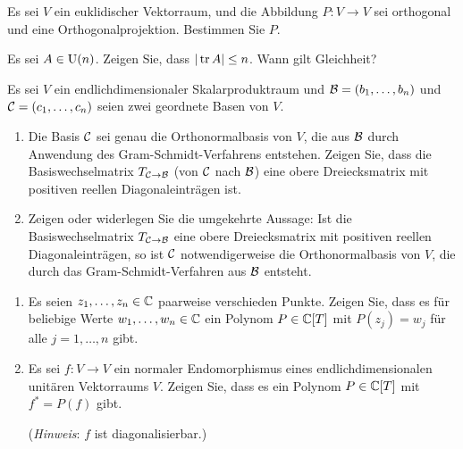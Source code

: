 \documentclass[a4paper,10pt]{scrartcl}
\begin{document}
\begin{question}
  Es sei $V$ ein euklidischer Vektorraum, und die Abbildung $P \colon V \to V$ sei orthogonal und eine Orthogonalprojektion.
  Bestimmen Sie $P$.
\end{question}


\begin{question}
  Es sei $A \in \operatorname{U}(n)$.
  Zeigen Sie, dass $|\operatorname{tr} A| \leq n$.
  Wann gilt Gleichheit?
\end{question}


\begin{question}
  Es sei $V$ ein endlichdimensionaler Skalarproduktraum und $\mathcal{B} = (b_1, \dotsc, b_n)$ und $\mathcal{C} = (c_1, \dotsc, c_n)$ seien zwei geordnete Basen von $V$.
  \begin{enumerate}
    \item
      Die Basis $\mathcal{C}$ sei genau die Orthonormalbasis von $V$, die aus $\mathcal{B}$ durch Anwendung des Gram-Schmidt-Verfahrens entstehen.
      Zeigen Sie, dass die Basiswechselmatrix $T_{\mathcal{C} \to \mathcal{B}}$ (von $\mathcal{C}$ nach $\mathcal{B}$) eine obere Dreiecksmatrix mit positiven reellen Diagonaleinträgen ist.
    \item
      Zeigen oder widerlegen Sie die umgekehrte Aussage:
      Ist die Basiswechselmatrix $T_{\mathcal{C} \to \mathcal{B}}$ eine obere Dreiecksmatrix mit positiven reellen Diagonaleinträgen, so ist $\mathcal{C}$ notwendigerweise die Orthonormalbasis von $V$, die durch das Gram-Schmidt-Verfahren aus $\mathcal{B}$ entsteht.
  \end{enumerate}
\end{question}


\begin{question}
  \begin{enumerate}[leftmargin=*]
    \item
      Es seien $z_1, \dotsc, z_n \in \mathbb{C}$ paarweise verschieden Punkte.
      Zeigen Sie, dass es für beliebige Werte $w_1, \dotsc, w_n \in \mathbb{C}$ ein Polynom $P \in \mathbb{C}[T]$ mit $P(z_j) = w_j$ für alle $j = 1, \dotsc, n$ gibt.
    \item
      Es sei $f \colon V \to V$ ein normaler Endomorphismus eines endlichdimensionalen unitären Vektorraums $V$.
      Zeigen Sie, dass es ein Polynom $P \in \mathbb{C}[T]$ mit $f^* = P(f)$ gibt.
      
      (\emph{Hinweis}:
       $f$ ist diagonalisierbar.)
  \end{enumerate}
\end{question}
\end{document}

